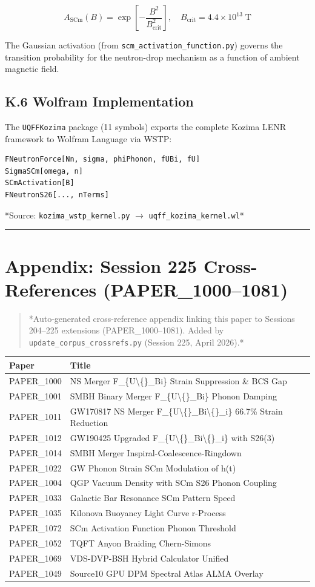 \documentclass[11pt]{article}
\begin{document}
$$A_{\mathrm{SCm}}(B) = \exp\!\left[-\frac{B^2}{B_{\mathrm{crit}}^2}\right], \quad B_{\mathrm{crit}} = 4.4 \times 10^{13} \;\text{T}$$

The Gaussian activation (from \verb|scm_activation_function.py|) governs the transition probability for the neutron-drop mechanism as a function of ambient magnetic field.

\subsection*{K.6 Wolfram Implementation}

The \verb|UQFFKozima| package (11 symbols) exports the complete Kozima LENR framework to Wolfram Language via WSTP:

\begin{verbatim}
FNeutronForce[Nn, sigma, phiPhonon, fUBi, fU]
SigmaSCm[omega, n]
SCmActivation[B]
FNeutronS26[..., nTerms]
\end{verbatim}

*Source: \verb|kozima_wstp_kernel.py| $\to$ \verb|uqff_kozima_kernel.wl|*

\noindent\rule{\textwidth}{0.4pt}

\section*{Appendix: Session 225 Cross-References (PAPER\_1000--1081)}

\begin{quote}
*Auto-generated cross-reference appendix linking this paper to
Sessions 204--225 extensions (PAPER\_1000--1081). Added by
\verb|update_corpus_crossrefs.py| (Session 225, April 2026).*
\end{quote}

\begin{center}
\begin{longtable}{ll}
\toprule
Paper & Title \tabularnewline
\midrule
\endhead
PAPER\_1000 & NS Merger F\_\{U\textbackslash\{\}\_Bi\} Strain Suppression \& BCS Gap \tabularnewline
PAPER\_1001 & SMBH Binary Merger F\_\{U\textbackslash\{\}\_Bi\} Phonon Damping \tabularnewline
PAPER\_1011 & GW170817 NS Merger F\_\{U\textbackslash\{\}\_Bi\textbackslash\{\}\_i\} 66.7\% Strain Reduction \tabularnewline
PAPER\_1012 & GW190425 Upgraded F\_\{U\textbackslash\{\}\_Bi\textbackslash\{\}\_i\} with S26(3) \tabularnewline
PAPER\_1014 & SMBH Merger Inspiral-Coalescence-Ringdown \tabularnewline
PAPER\_1022 & GW Phonon Strain SCm Modulation of h(t) \tabularnewline
PAPER\_1004 & QGP Vacuum Density with SCm S26 Phonon Coupling \tabularnewline
PAPER\_1033 & Galactic Bar Resonance SCm Pattern Speed \tabularnewline
PAPER\_1035 & Kilonova Buoyancy Light Curve r-Process \tabularnewline
PAPER\_1072 & SCm Activation Function Phonon Threshold \tabularnewline
PAPER\_1052 & TQFT Anyon Braiding Chern-Simons \tabularnewline
PAPER\_1069 & VDS-DVP-BSH Hybrid Calculator Unified \tabularnewline
PAPER\_1049 & Source10 GPU DPM Spectral Atlas ALMA Overlay \tabularnewline
\bottomrule
\end{longtable}
\end{center}
\end{document}

